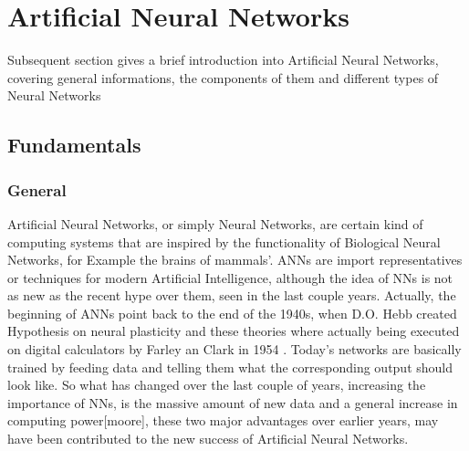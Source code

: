 \chapter{Artificial Neural Networks}\label{chapter:Related Work}
Subsequent section gives a brief introduction into Artificial Neural Networks, covering general informations, the components of them and different types of Neural Networks

\section{Fundamentals}
\subsection{General}
Artificial Neural Networks, or simply Neural Networks, are certain kind of computing systems that are inspired by the functionality of Biological Neural Networks, for Example the brains of mammals'. ANNs are import representatives or techniques for modern Artificial Intelligence, although the idea of NNs is not as new as the recent hype over them, seen in the last couple years. Actually, the beginning of ANNs point back to the end of the 1940s, when D.O. Hebb created Hypothesis on neural plasticity \cite{hebb} and these theories where actually being executed on digital calculators by Farley an Clark in 1954 \cite{farleyclark}. Today's networks are basically trained by feeding data and telling them what the corresponding output should look like. So what has changed over the last couple of years, increasing the importance of NNs, is the massive amount of new data and a general increase in computing power[moore], these two major advantages over earlier years, may have been contributed to the new success of Artificial Neural Networks.

